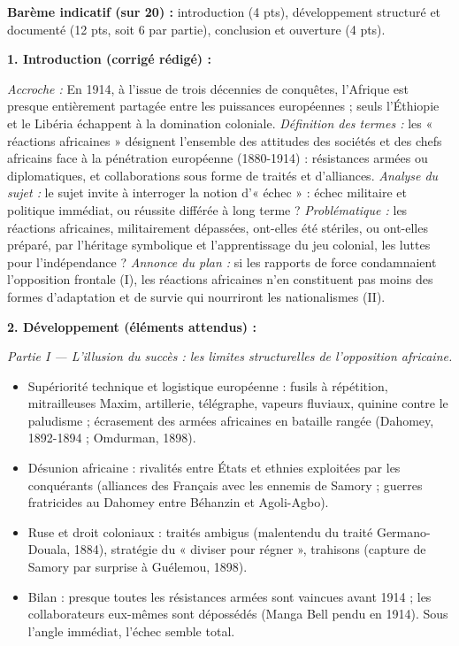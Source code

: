 \documentclass[11pt]{article}
\begin{document}
\begin{corrige}
\textbf{Barème indicatif (sur 20) :} introduction (4 pts), développement structuré et documenté (12 pts, soit 6 par partie), conclusion et ouverture (4 pts).

\textbf{1. Introduction (corrigé rédigé) :}

\emph{Accroche :} En 1914, à l'issue de trois décennies de conquêtes, l'Afrique est presque entièrement partagée entre les puissances européennes ; seuls l'Éthiopie et le Libéria échappent à la domination coloniale.
\emph{Définition des termes :} les « réactions africaines » désignent l'ensemble des attitudes des sociétés et des chefs africains face à la pénétration européenne (1880-1914) : résistances armées ou diplomatiques, et collaborations sous forme de traités et d'alliances.
\emph{Analyse du sujet :} le sujet invite à interroger la notion d'« échec » : échec militaire et politique immédiat, ou réussite différée à long terme ?
\emph{Problématique :} les réactions africaines, militairement dépassées, ont-elles été stériles, ou ont-elles préparé, par l'héritage symbolique et l'apprentissage du jeu colonial, les luttes pour l'indépendance ?
\emph{Annonce du plan :} si les rapports de force condamnaient l'opposition frontale (I), les réactions africaines n'en constituent pas moins des formes d'adaptation et de survie qui nourriront les nationalismes (II).

\textbf{2. Développement (éléments attendus) :}

\emph{Partie I — L'illusion du succès : les limites structurelles de l'opposition africaine.}
\begin{itemize}
    \item Supériorité technique et logistique européenne : fusils à répétition, mitrailleuses Maxim, artillerie, télégraphe, vapeurs fluviaux, quinine contre le paludisme ; écrasement des armées africaines en bataille rangée (Dahomey, 1892-1894 ; Omdurman, 1898).
    \item Désunion africaine : rivalités entre États et ethnies exploitées par les conquérants (alliances des Français avec les ennemis de Samory ; guerres fratricides au Dahomey entre Béhanzin et Agoli-Agbo).
    \item Ruse et droit coloniaux : traités ambigus (malentendu du traité Germano-Douala, 1884), stratégie du « diviser pour régner », trahisons (capture de Samory par surprise à Guélemou, 1898).
    \item Bilan : presque toutes les résistances armées sont vaincues avant 1914 ; les collaborateurs eux-mêmes sont dépossédés (Manga Bell pendu en 1914). Sous l'angle immédiat, l'échec semble total.
\end{itemize}


\end{corrige}
\end{document}
